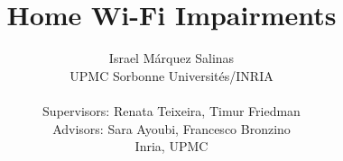 \documentclass[sigconf]{Template}
\begin{document}
\title{Home Wi-Fi Impairments}
\author{Israel M\'{a}rquez Salinas \\UPMC Sorbonne Universit\'{e}s/INRIA \\\\ { Supervisors: Renata Teixeira, Timur Friedman}\\ {Advisors: Sara Ayoubi, Francesco Bronzino} \\{Inria, UPMC} }

\maketitle








%



\end{document}
